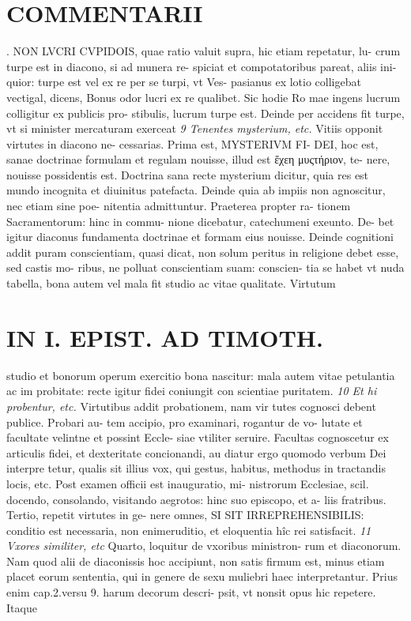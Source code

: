 \documentclass{article}
\begin{document}
\begin{pages}
\section*{COMMENTARII }
\marginpar{[ p.72 ]}. NON LVCRI CVPIDOIS, quae ratio valuit supra, hic etiam repetatur, lu- crum turpe est in diacono, si ad munera re- spiciat et compotatoribus pareat, aliis ini- quior: turpe est vel ex re per se turpi, vt Ves- pasianus ex lotio colligebat vectigal, dicens, Bonus odor lucri ex re qualibet. Sic hodie Ro mae ingens lucrum colligitur ex publicis pro- stibulis, lucrum turpe est. Deinde per accidens fit turpe, vt si minister mercaturam exerceat  \pend
\textit{9 Tenentes mysterium, etc. }\pstart Vitiis opponit virtutes in diacono ne- cessarias. Prima est, MYSTERIVM FI- DEI, hoc est, sanae doctrinae formulam et regulam nouisse, illud est ἔχεη μυςτήριον, te- nere, nouisse possidentis est. Doctrina sana recte mysterium dicitur, quia res est mundo incognita et diuinitus patefacta. Deinde quia ab impiis non agnoscitur, nec etiam sine poe- nitentia admittuntur. Praeterea propter ra- tionem Sacramentorum: hinc in commu- nione dicebatur, catechumeni exeunto. De- bet igitur diaconus fundamenta doctrinae et formam eius nouisse. Deinde cognitioni addit puram conscientiam, quasi dicat, non solum peritus in religione debet esse, sed castis mo- ribus, ne polluat conscientiam suam: conscien- tia se habet vt nuda tabella, bona autem vel mala fit studio ac vitae qualitate. Virtutum  \pend
\section*{IN I. EPIST. AD TIMOTH. }
\marginpar{[ p.73 ]}\pstart studio et bonorum operum exercitio bona nascitur: mala autem vitae petulantia ac im probitate: recte igitur fidei coniungit con scientiae puritatem.  \pend
\textit{10 Et hi probentur, etc. }\pstart Virtutibus addit probationem, nam vir tutes cognosci debent publice. Probari au- tem accipio, pro examinari, rogantur de vo- lutate et facultate velintne et possint Eccle- siae vtiliter seruire. Facultas cognoscetur ex articulis fidei, et dexteritate concionandi, au diatur ergo quomodo verbum Dei interpre tetur, qualis sit illius vox, qui gestus, habitus, methodus in tractandis locis, etc.  \pend\pstart Post examen officii est inauguratio, mi- nistrorum Ecclesiae, scil. docendo, consolando, visitando aegrotos: hinc suo episcopo, et a- liis fratribus. Tertio, repetit virtutes in ge- nere omnes, SI SIT IRREPREHENSIBILIS: conditio est necessaria, non enimeruditio, et eloquentia hîc rei satisfacit.  \pend
\textit{11 Vxores similiter, etc }\pstart Quarto, loquitur de vxoribus ministron- rum et diaconorum. Nam quod alii de diaconissis hoc accipiunt, non satis firmum est, minus etiam placet eorum sententia, qui in genere de sexu muliebri haec interpretantur. Prius enim cap.2.versu 9. harum decorum descri- psit, vt nonsit opus hic repetere. Itaque  \pend

\end{pages}
\end{document}
